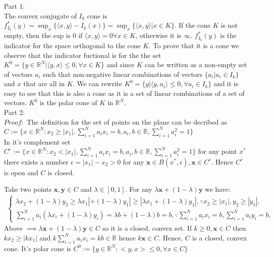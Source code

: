 \documentclass[12pt]{report}
\begin{document}
Part 1:\\
The convex conjugate of $I_k$ cone is
$f^*_{I_k}(y)= \sup_x\{\langle x,y \rangle-I_k(x)\}=\sup_x\{\langle x,y \rangle|x\in K\}$. If the cone $K$ is not empty, then
the sup is 0 if $\langle x, y \rangle = 0 \forall x\in K$, otherwise it is $\infty$. $f^*_{I_k}(y)$ is the indicator for the
space orthogonal to the cone $K$. To prove that it is a cone we observe that the indicator fuctional is for the the set 
$K^0=\{ y\in\mathbb{R}^N| \langle y,x \rangle \leq 0, \forall x \in K\} $ and since $K$ can be written as a non-empty set of
vectors $a_i$ such that non-negative linear combinations of vectors $\{a_i|a_i \in I_k\}$ and $x$ that are all in $K$.
We can rewrite $K^0=\{ y| \langle y,a_i \rangle \leq 0, \forall a_i \in I_k\} $ and it is easy to see that this is also a cone as
it is a set of linear combinations of a set of vectors. $K^0$ is the polar cone of $K$ in $\mathbb{R}^N$.\\
Part 2:\\
$Proof:$ The definition for the set of points on the plane can be decribed as \\
$C:=\{ x\in \mathbb{R}^N: x_2\geq |x_1|, \sum_{i=1}^N a_i x_i = b, a_i,b\in\mathbb{R}, \sum_{i=1}^N a_i^2=1  \}$ \\
In it's complement set \\
$C^c:=\{ x\in \mathbb{R}^N: x_2 < |x_1|, \sum_{i=1}^N a_i x_i = b, a_i,b\in\mathbb{R}, \sum_{i=1}^N a_i^2=1  \}$ for any point
$x^*$ there exists a number $\epsilon=|x_1|-x_2>0$ for any $\mathbf{x}\in B(x^*,\epsilon), \mathbf{x}\in C^c$. Hence $C^c$ is
open and $C$ is closed.

Take two points $\mathbf{x},\mathbf{y} \in C$ and $\lambda\in[0,1]$. For any $\lambda\mathbf{x}+(1-\lambda)\mathbf{y}$ we have:
\begin{align*}
\left\{
\begin{array}{l}
\lambda x_2+(1-\lambda )y_2 \geq \lambda x_1|+(1-\lambda )y_1| \geq |\lambda x_1+(1-\lambda )y_1 |,
	\because x_2\geq |x_1|, y_2\geq |y_1|, \\
\sum_{i=1}^N a_i(\lambda x_i+(1-\lambda )y_i) = \lambda b + (1-\lambda )b = b, \because\sum_{i=1}^N a_i x_i = b,
	\sum_{i=1}^N a_i y_i = b,
\end{array}
\right.
\end{align*}
Above $\implies\lambda\mathbf{x}+(1-\lambda)\mathbf{y}\in C$ so it is a closed, convex set.
If $k\geq 0, \mathbf{x}\in C$ then $kx_2\geq |kx_1|$ and $k\sum_{i=1}^N a_i x_i = kb \in \mathbb{R}$ hence $k\mathbf{x}\in C$.
Hence, $C$ is a closed, convex cone. It's polar cone is
$C^0 := \{y\in \mathbb{R}^N: <y,x>\leq 0, \forall x \in C \}$
\end{document}

